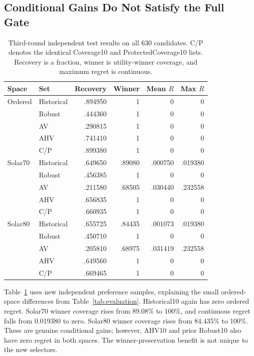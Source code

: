 \documentclass{llncs}
\begin{document}
\subsection{Conditional Gains Do Not Satisfy the Full Gate}
\begin{table}[tbp]\centering\small
\caption{Third-round independent test results on all 630 candidates. C/P denotes the identical Coverage10 and ProtectedCoverage10 lists. Recovery is a fraction, winner is utility-winner coverage, and maximum regret is continuous.}\label{tab:solar}
\begin{tabular}{llrrrr}\toprule
Space & Set & Recovery & Winner & Mean $R$ & Max $R$\\\midrule
Ordered & Historical & .894950 & 1 & 0 & 0\\
 & Robust & .444360 & 1 & 0 & 0\\
 & AV & .290815 & 1 & 0 & 0\\
 & AHV & .741410 & 1 & 0 & 0\\
 & C/P & .899380 & 1 & 0 & 0\\
Solar70 & Historical & .649650 & .89080 & .000750 & .019380\\
 & Robust & .456385 & 1 & 0 & 0\\
 & AV & .211580 & .68505 & .030440 & .232558\\
 & AHV & .656835 & 1 & 0 & 0\\
 & C/P & .660935 & 1 & 0 & 0\\
Solar80 & Historical & .655725 & .84435 & .001073 & .019380\\
 & Robust & .450710 & 1 & 0 & 0\\
 & AV & .205810 & .68975 & .031419 & .232558\\
 & AHV & .649560 & 1 & 0 & 0\\
 & C/P & .669465 & 1 & 0 & 0\\\bottomrule
\end{tabular}\end{table}
Table~\ref{tab:solar} uses new independent preference samples, explaining the small ordered-space differences from Table~\ref{tab:evaluation}. Historical10 again has zero ordered regret. Solar70 winner coverage rises from 89.08\% to 100\%, and continuous regret falls from 0.019380 to zero. Solar80 winner coverage rises from 84.435\% to 100\%. These are genuine conditional gains; however, AHV10 and prior Robust10 also have zero regret in both spaces. The winner-preservation benefit is not unique to the new selectors.
\end{document}
